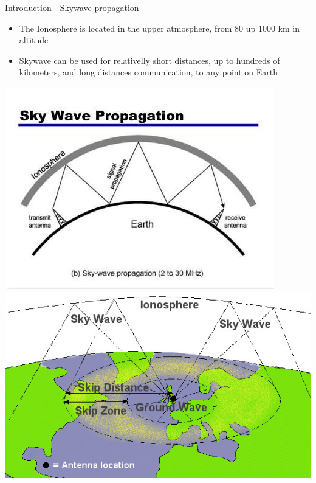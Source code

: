 \documentclass[aspectratio=169,xcolor={x11names,svgnames,dvipsnames}]{beamer}
\begin{document}
\begin{frame}{Introduction - Skywave propagation}

  \begin{itemize}
  \item The Ionosphere is located in the upper atmosphere, from 80 up 1000 km in altitude
  \item Skywave can be used for relativelly short distances, up to hundreds of kilometers, and
    long distances communication, to any point on Earth
  \end{itemize}


\begin{center}
  \includegraphics[width=.48\columnwidth]{skywave.jpeg}
  \includegraphics[width=.5\columnwidth]{skywave.jpg}

\end{center}

\end{frame}
\end{document}

